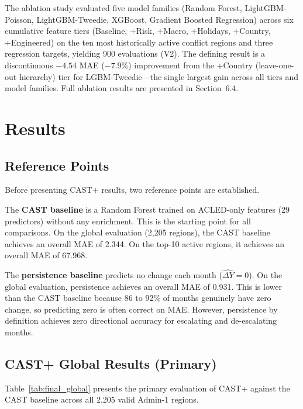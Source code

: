 \documentclass[12pt,a4paper]{article}
\begin{document}
The ablation study evaluated five model families (Random Forest,
LightGBM-Poisson, LightGBM-Tweedie, XGBoost, Gradient Boosted
Regression) across six cumulative feature tiers (Baseline, +Risk,
+Macro, +Holidays, +Country, +Engineered) on the ten most
historically active conflict regions and three regression targets,
yielding 900 evaluations (V2). The defining result is a
discontinuous $-4.54$ MAE ($-7.9\%$) improvement from the +Country
(leave-one-out hierarchy) tier for LGBM-Tweedie---the single largest
gain across all tiers and model families. Full ablation results are
presented in Section~6.4.


\section{Results}

\subsection{Reference Points}

Before presenting CAST+ results, two reference points are established.

The \textbf{CAST baseline} is a Random Forest trained on ACLED-only
features (29 predictors) without any enrichment. This is the starting
point for all comparisons. On the global evaluation (2,205 regions),
the CAST baseline achieves an overall MAE of 2.344. On the top-10 active
regions, it achieves an overall MAE of 67.968.

The \textbf{persistence baseline} predicts no change each month
($\hat{\Delta Y} = 0$). On the global evaluation, persistence achieves
an overall MAE of 0.931. This is lower than the CAST baseline because
86 to 92\% of months genuinely have zero change, so predicting zero is
often correct on MAE. However, persistence by definition achieves zero
directional accuracy for escalating and de-escalating months.

\subsection{CAST+ Global Results (Primary)}

Table~\ref{tab:final_global} presents the primary evaluation of CAST+
against the CAST baseline across all 2,205 valid Admin-1 regions.
\end{document}
